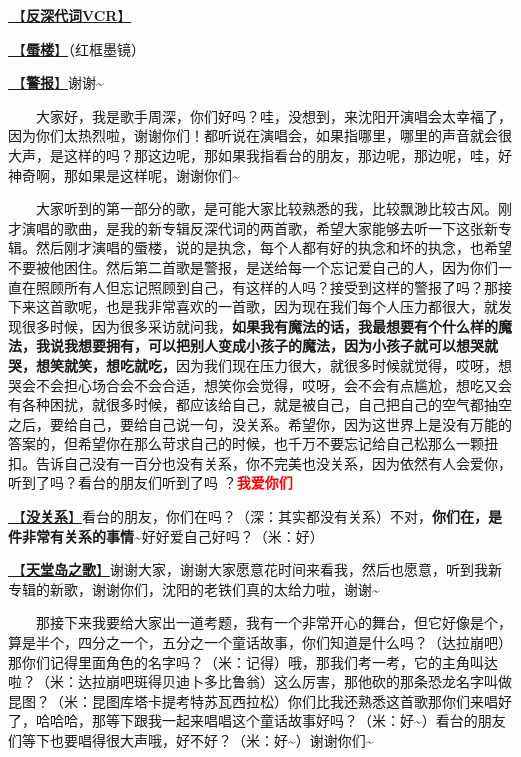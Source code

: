 \documentclass[]{ctexbook}
\begin{document}
\hyperref[senself-vcr]{🎥【\textbf{反深代词VCR}】}

\hyperref[mirage]{🎵【\textbf{蜃楼}】}（红框墨镜）

\hyperref[the-giver]{🎵【\textbf{警报}】}谢谢\textasciitilde{}

  大家好，我是歌手周深，你们好吗？哇，没想到，来沈阳开演唱会太幸福了，因为你们太热烈啦，谢谢你们！都听说在演唱会，如果指哪里，哪里的声音就会很大声，是这样的吗？那这边呢，那如果我指看台的朋友，那边呢，那边呢，哇，好神奇啊，那如果是这样呢，谢谢你们\textasciitilde{}

  大家听到的第一部分的歌，是可能大家比较熟悉的我，比较飘渺比较古风。刚才演唱的歌曲，是我的新专辑反深代词的两首歌，希望大家能够去听一下这张新专辑。然后刚才演唱的蜃楼，说的是执念，每个人都有好的执念和坏的执念，也希望不要被他困住。然后第二首歌是警报，是送给每一个忘记爱自己的人，因为你们一直在照顾所有人但忘记照顾到自己，有这样的人吗？接受到这样的警报了吗？那接下来这首歌呢，也是我非常喜欢的一首歌，因为现在我们每个人压力都很大，就发现很多时候，因为很多采访就问我，\textbf{如果我有魔法的话，我最想要有个什么样的魔法，我说我想要拥有，可以把别人变成小孩子的魔法，因为小孩子就可以想哭就哭，想笑就笑，想吃就吃，}因为我们现在压力很大，就很多时候就觉得，哎呀，想哭会不会担心场合会不会合适，想笑你会觉得，哎呀，会不会有点尴尬，想吃又会有各种困扰，就很多时候，都应该给自己，就是被自己，自己把自己的空气都抽空之后，要给自己，要给自己说一句，没关系。希望你，因为这世界上是没有万能的答案的，但希望你在那么苛求自己的时候，也千万不要忘记给自己松那么一颗扭扣。告诉自己没有一百分也没有关系，你不完美也没关系，因为依然有人会爱你，听到了吗？看台的朋友们听到了吗 ？\textbf{\textcolor{red}{我爱你们~} }

\hyperref[life-is-like-a-box-of-chocolates]{🎵【\textbf{没关系}】}看台的朋友，你们在吗？（深：其实都没有关系）不对，\textbf{你们在，是件非常有关系的事情\textasciitilde{}}好好爱自己好吗？（米：好）

\hyperref[haven-song]{🎵【\textbf{天堂岛之歌}】}谢谢大家，谢谢大家愿意花时间来看我，然后也愿意，听到我新专辑的新歌，谢谢你们，沈阳的老铁们真的太给力啦，谢谢\textasciitilde{}

  那接下来我要给大家出一道考题，我有一个非常开心的舞台，但它好像是个，算是半个，四分之一个，五分之一个童话故事，你们知道是什么吗？（达拉崩吧）那你们记得里面角色的名字吗？（米：记得）哦，那我们考一考，它的主角叫达啦？（米：达拉崩吧斑得贝迪卜多比鲁翁）这么厉害，那他砍的那条恐龙名字叫做昆图？（米：昆图库塔卡提考特苏瓦西拉松）你们比我还熟悉这首歌那你们来唱好了，哈哈哈，那等下跟我一起来唱唱这个童话故事好吗？（米：好\textasciitilde）看台的朋友们等下也要唱得很大声哦，好不好？（米：好\textasciitilde）谢谢你们\textasciitilde{}
\end{document}
